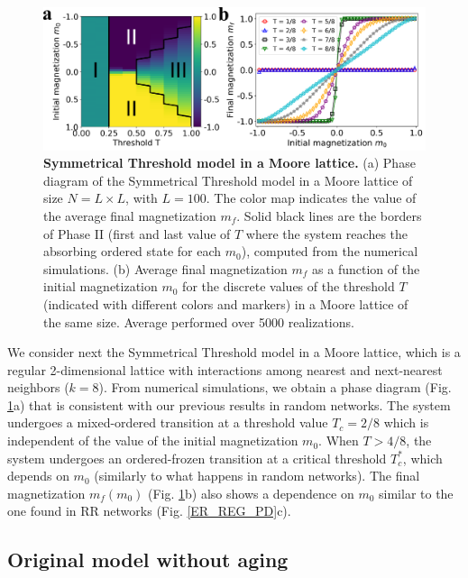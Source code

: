 	\begin{figure}
		 \centering
		 \includegraphics[width=\textwidth]{Figs/Aging_STM/FIG9.pdf}
		 \caption{\label{LAT_PD} \textbf{Symmetrical Threshold model in a Moore lattice.} (a) Phase diagram of the Symmetrical Threshold model in a Moore lattice of size $N = L \times L$, with $L = 100$. The color map indicates the value of the average final magnetization $m_f$. Solid black lines are the borders of Phase II (first and last value of $T$ where the system reaches the absorbing ordered state for each $m_0$), computed from the numerical simulations. (b) Average final magnetization $m_f$ as a function of the initial magnetization $m_0$ for the discrete values of the threshold $T$ (indicated with different colors and markers) in a Moore lattice of the same size. Average performed over 5000 realizations.}
	\end{figure}
	
	We consider next the Symmetrical Threshold model in a Moore lattice, which is a regular 2-dimensional lattice with interactions among nearest and next-nearest neighbors ($k=8$).  From numerical simulations, we obtain a phase diagram (Fig. \ref{LAT_PD}a) that is consistent with our previous results in random networks. The system undergoes a mixed-ordered transition at a threshold value $T_{c} = 2/8$  which is independent of the value of the initial magnetization $m_0$. When $T > 4/8$, the system undergoes an ordered-frozen transition at a critical threshold $T_{c}^{*}$, which depends on $m_0$ (similarly to what happens in random networks). The final magnetization $m_f(m_0)$ (Fig. \ref{LAT_PD}b) also shows a dependence on $m_0$ similar to the one found in RR networks (Fig. \ref{ER_REG_PD}c).
	
	\subsection{Original model without aging}
	
